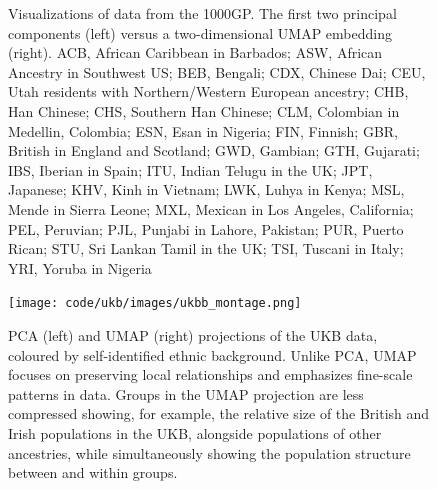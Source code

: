 \documentclass[12pt]{article}
\begin{document}
\begin{figure}[h!]
\begin{subfigure}[b]{0.45\linewidth}
    \caption{}
    \label{fig:UMAP}
  \end{subfigure}
  \caption{Visualizations of data from the 1000GP. The first two principal components (left) versus a two-dimensional UMAP embedding (right).     ACB, African Caribbean in Barbados;
    ASW, African Ancestry in Southwest US;
    BEB, Bengali;
    CDX, Chinese Dai;
    CEU, Utah residents with Northern/Western European ancestry;
    CHB, Han Chinese;
    CHS, Southern Han Chinese;
    CLM, Colombian in Medellin, Colombia;
    ESN, Esan in Nigeria;
    FIN, Finnish;
    GBR, British in England and Scotland;
    GWD, Gambian;
    GTH, Gujarati;
    IBS, Iberian in Spain;
    ITU, Indian Telugu in the UK;
    JPT, Japanese;
    KHV, Kinh in Vietnam;
    LWK, Luhya in Kenya;
    MSL, Mende in Sierra Leone;
    MXL, Mexican in Los Angeles, California;
    PEL, Peruvian;
    PJL, Punjabi in Lahore, Pakistan;
    PUR, Puerto Rican;
    STU, Sri Lankan Tamil in the UK;
    TSI, Tuscani in Italy;
    YRI, Yoruba in Nigeria }
  \label{fig:PCA_and_UMAP}
\end{figure}

\clearpage

\begin{figure}[h!]
  \centering
    \texttt{[image: code/ukb/images/ukbb\_montage.png]}
  \caption{PCA (left) and UMAP (right) projections of the UKB data, coloured by self-identified ethnic background. Unlike PCA, UMAP focuses on preserving local relationships and emphasizes fine-scale patterns in data. Groups in the UMAP projection are less compressed showing, for example, the relative size of the British and Irish populations in the UKB, alongside populations of other ancestries, while simultaneously showing the population structure between and within groups.}
  \label{fig:UKB}
\end{figure}

\clearpage
\end{document}
